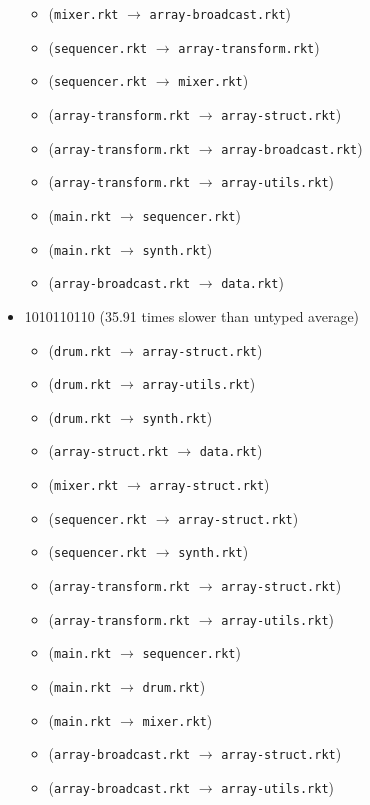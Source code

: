 \documentclass{article}
\newcommand{\mono}[1]{\texttt{#1}}
\begin{document}
\begin{itemize}
\begin{itemize}
  \item (\mono{mixer.rkt} $\rightarrow$ \mono{array-broadcast.rkt})
  \item (\mono{sequencer.rkt} $\rightarrow$ \mono{array-transform.rkt})
  \item (\mono{sequencer.rkt} $\rightarrow$ \mono{mixer.rkt})
  \item (\mono{array-transform.rkt} $\rightarrow$ \mono{array-struct.rkt})
  \item (\mono{array-transform.rkt} $\rightarrow$ \mono{array-broadcast.rkt})
  \item (\mono{array-transform.rkt} $\rightarrow$ \mono{array-utils.rkt})
  \item (\mono{main.rkt} $\rightarrow$ \mono{sequencer.rkt})
  \item (\mono{main.rkt} $\rightarrow$ \mono{synth.rkt})
  \item (\mono{array-broadcast.rkt} $\rightarrow$ \mono{data.rkt})
  \end{itemize}
\item 1010110110 (35.91 times slower than untyped average)
  \begin{itemize}
  \item (\mono{drum.rkt} $\rightarrow$ \mono{array-struct.rkt})
  \item (\mono{drum.rkt} $\rightarrow$ \mono{array-utils.rkt})
  \item (\mono{drum.rkt} $\rightarrow$ \mono{synth.rkt})
  \item (\mono{array-struct.rkt} $\rightarrow$ \mono{data.rkt})
  \item (\mono{mixer.rkt} $\rightarrow$ \mono{array-struct.rkt})
  \item (\mono{sequencer.rkt} $\rightarrow$ \mono{array-struct.rkt})
  \item (\mono{sequencer.rkt} $\rightarrow$ \mono{synth.rkt})
  \item (\mono{array-transform.rkt} $\rightarrow$ \mono{array-struct.rkt})
  \item (\mono{array-transform.rkt} $\rightarrow$ \mono{array-utils.rkt})
  \item (\mono{main.rkt} $\rightarrow$ \mono{sequencer.rkt})
  \item (\mono{main.rkt} $\rightarrow$ \mono{drum.rkt})
  \item (\mono{main.rkt} $\rightarrow$ \mono{mixer.rkt})
  \item (\mono{array-broadcast.rkt} $\rightarrow$ \mono{array-struct.rkt})
  \item (\mono{array-broadcast.rkt} $\rightarrow$ \mono{array-utils.rkt})

\end{itemize}
\end{itemize}
\end{document}
